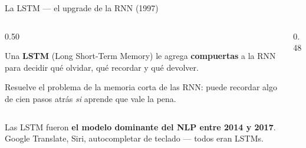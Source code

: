 \documentclass[aspectratio=169, 11pt]{beamer}
\begin{document}
\begin{frame}[shrink]{La LSTM --- el upgrade de la RNN (1997)}
  \begin{columns}[c]
    \begin{column}{0.50\textwidth}
      \begin{tcolorbox}[colback=arcaGray, colframe=arcaRed, leftrule=3pt,
        boxrule=0pt, sharp corners, left=8pt, right=8pt, top=4pt, bottom=4pt]
        {\footnotesize\color{arcaDark}
        Una \textbf{LSTM} (Long Short-Term Memory) le agrega \textbf{compuertas}
        a la RNN para decidir qué olvidar, qué recordar y qué devolver.\par
        \vspace{4pt}
        Resuelve el problema de la memoria corta de las RNN: puede recordar
        algo de cien pasos atrás \emph{si} aprende que vale la pena.}
      \end{tcolorbox}
    \end{column}
    \begin{column}{0.48\textwidth}
      \begin{center}
      \end{center}
    \end{column}
  \end{columns}
  \vspace{8pt}
  {\footnotesize\color{arcaDark}
  Las LSTM fueron \textbf{el modelo dominante del NLP entre 2014 y 2017}.
  Google Translate, Siri, autocompletar de teclado --- todos eran LSTMs.}
\end{frame}
\end{document}
